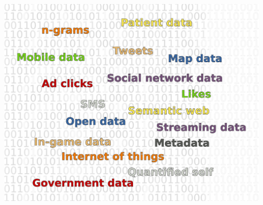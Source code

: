 

\begin{frame}
\begin{center}
\includegraphics[width=1\textwidth]{graphics/data_cloud2.pdf}
\end{center}
\end{frame}

